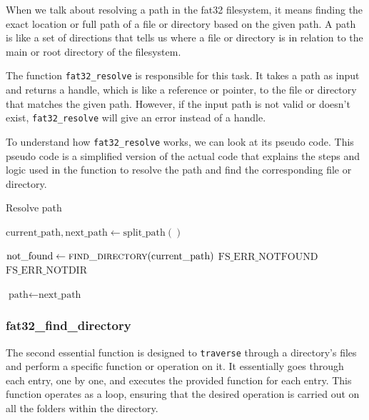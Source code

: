 When we talk about resolving a path in the fat32 filesystem, it means finding the exact location or full path of a file or directory based on the given path. A path is like a set of directions that tells us where a file or directory is in relation to the main or root directory of the filesystem.

The function \texttt{fat32\_resolve} is responsible for this task. It takes a path as input and returns a handle, which is like a reference or pointer, to the file or directory that matches the given path. However, if the input path is not valid or doesn't exist, \texttt{fat32\_resolve} will give an error instead of a handle.

To understand how \texttt{fat32\_resolve} works, we can look at its pseudo code. This pseudo code is a simplified version of the actual code that explains the steps and logic used in the function to resolve the path and find the corresponding file or directory.

\begin{algorithm}
\caption{Resolve path}
\begin{algorithmic}
    \State {}
    
            \State $\text{current\_path}, \text{next\_path} \gets \text{split\_path}()$
            
            \State $\text{not\_found} \gets \Call{find\_directory}{\text{current\_path}}$
                \Return $\text{FS\_ERR\_NOTFOUND}$
            \EndIf
                \State \Return $\text{FS\_ERR\_NOTDIR}$
            \EndIf
            
            \State $\text{path} \gets \text{next\_path}$
    \EndWhile

    \State {}
\EndProcedure
\end{algorithmic}
\end{algorithm}

\subsubsection{fat32\_find\_directory}

The second essential function is designed to \texttt{traverse} through a directory's files and perform a specific function or operation on it. It essentially goes through each entry, one by one, and executes the provided function for each entry. This function operates as a loop, ensuring that the desired operation is carried out on all the folders within the directory.

